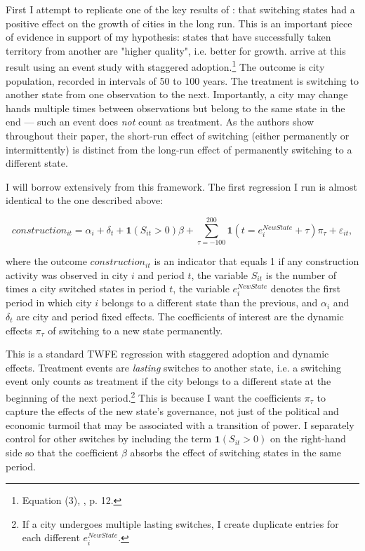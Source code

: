 \documentclass[11pt, a4paper]{article}
\begin{document}
First I attempt to replicate one of the key results of \cite{schoenholzer2022}: that switching states had a positive effect on the growth of cities in the long run. This is an important piece of evidence in support of my hypothesis: states that have successfully taken territory from another are "higher quality", i.e. better for growth. \cite{schoenholzer2022} arrive at this result using an event study with staggered adoption.\footnote
{
    Equation (3), \citealp{schoenholzer2022}, p. 12.
}
The outcome is city population, recorded in intervals of 50 to 100 years. The treatment is switching to another state from one observation to the next. Importantly, a city may change hands multiple times between observations but belong to the same state in the end --- such an event does \textit{not} count as treatment. As the authors show throughout their paper, the short-run effect of switching (either permanently or intermittently) is distinct from the long-run effect of permanently switching to a different state.

I will borrow extensively from this framework. The first regression I run is almost identical to the one described above:

\begin{equation}
\label{eq:sw22}
    construction_{it} = \alpha_i + \delta_t + \mathbf{1}(S_{it} > 0)\beta + 
    \sum_{\tau = -100}^{200} \mathbf{1}(t = e^{NewState}_i + \tau)\pi_\tau + \varepsilon_{it},
\end{equation}

where the outcome $construction_{it}$ is an indicator that equals 1 if any construction activity was observed in city $i$ and period $t$, the variable $S_{it}$ is the number of times a city switched states in period $t$, the variable $e^{NewState}_i$ denotes the first period in which city $i$ belongs to a different state than the previous, and $\alpha_i$ and $\delta_t$ are city and period fixed effects. The coefficients of interest are the dynamic effects $\pi_\tau$ of switching to a new state permanently. 

This is a standard TWFE regression with staggered adoption and dynamic effects. Treatment events are \textit{lasting} switches to another state, i.e. a switching event only counts as treatment if the city belongs to a different state at the beginning of the next period.\footnote
{
    If a city undergoes multiple lasting switches, I create duplicate entries for each different $e^{NewState}_i$.
}
This is because I want the coefficients $\pi_\tau$ to capture the effects of the new state's governance, not just of the political and economic turmoil that may be associated with a transition of power. I separately control for other switches by including the term $\mathbf{1}(S_{it} > 0)$ on the right-hand side so that the coefficient $\beta$ absorbs the effect of switching states in the same period.
\end{document}
